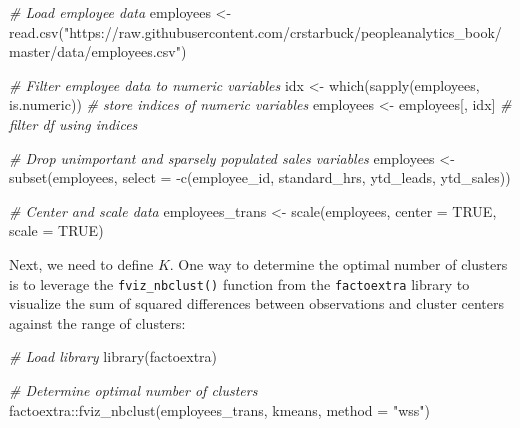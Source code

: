 \documentclass[
]{book}
\newenvironment{Shaded}{\begin{snugshade}}{\end{snugshade}}
\newcommand{\AttributeTok}[1]{\textcolor[rgb]{0.77,0.63,0.00}{#1}}
\newcommand{\CommentTok}[1]{\textcolor[rgb]{0.56,0.35,0.01}{\textit{#1}}}
\newcommand{\ConstantTok}[1]{\textcolor[rgb]{0.00,0.00,0.00}{#1}}
\newcommand{\FunctionTok}[1]{\textcolor[rgb]{0.00,0.00,0.00}{#1}}
\newcommand{\NormalTok}[1]{#1}
\newcommand{\OtherTok}[1]{\textcolor[rgb]{0.56,0.35,0.01}{#1}}
\newcommand{\SpecialCharTok}[1]{\textcolor[rgb]{0.00,0.00,0.00}{#1}}
\newcommand{\StringTok}[1]{\textcolor[rgb]{0.31,0.60,0.02}{#1}}
\begin{document}
\begin{Shaded}
\begin{Highlighting}[]
\CommentTok{\# Load employee data}
\NormalTok{employees }\OtherTok{\textless{}{-}} \FunctionTok{read.csv}\NormalTok{(}\StringTok{"https://raw.githubusercontent.com/crstarbuck/peopleanalytics\_book/master/data/employees.csv"}\NormalTok{)}

\CommentTok{\# Filter employee data to numeric variables}
\NormalTok{idx }\OtherTok{\textless{}{-}} \FunctionTok{which}\NormalTok{(}\FunctionTok{sapply}\NormalTok{(employees, is.numeric)) }\CommentTok{\# store indices of numeric variables}
\NormalTok{employees }\OtherTok{\textless{}{-}}\NormalTok{ employees[, idx] }\CommentTok{\# filter df using indices}

\CommentTok{\# Drop unimportant and sparsely populated sales variables}
\NormalTok{employees }\OtherTok{\textless{}{-}} \FunctionTok{subset}\NormalTok{(employees, }\AttributeTok{select =} \SpecialCharTok{{-}}\FunctionTok{c}\NormalTok{(employee\_id, standard\_hrs, ytd\_leads, ytd\_sales))}

\CommentTok{\# Center and scale data}
\NormalTok{employees\_trans }\OtherTok{\textless{}{-}} \FunctionTok{scale}\NormalTok{(employees, }\AttributeTok{center =} \ConstantTok{TRUE}\NormalTok{, }\AttributeTok{scale =} \ConstantTok{TRUE}\NormalTok{)}
\end{Highlighting}
\end{Shaded}

Next, we need to define \(K\). One way to determine the optimal number of clusters is to leverage the \texttt{fviz\_nbclust()} function from the \texttt{factoextra} library to visualize the sum of squared differences between observations and cluster centers against the range of clusters:

\begin{Shaded}
\begin{Highlighting}[]
\CommentTok{\# Load library}
\FunctionTok{library}\NormalTok{(factoextra)}

\CommentTok{\# Determine optimal number of clusters}
\NormalTok{factoextra}\SpecialCharTok{::}\FunctionTok{fviz\_nbclust}\NormalTok{(employees\_trans, kmeans, }\AttributeTok{method =} \StringTok{"wss"}\NormalTok{)}
\end{Highlighting}
\end{Shaded}
\end{document}
